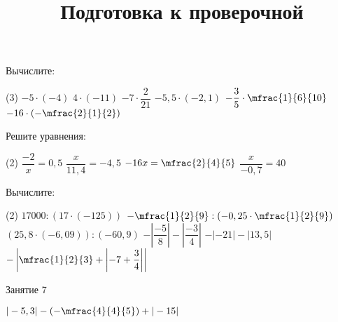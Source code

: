 \begin{homework}[number=3]
	\begin{listofex}
		\item Вычислите:
		\begin{tasks}(3)
			\task \( -5 \cdot (-4) \)
			\task \( 4 \cdot (-11) \)
			\task \( -7 \cdot \dfrac{2}{21} \)
			\task \( -5,5 \cdot (-2,1) \)
			\task \( -\dfrac{3}{5}\cdot \mfrac{1}{6}{10} \)
			\task \( -16 \cdot \left( -\mfrac{2}{1}{2} \right) \)
		\end{tasks}
		\item Решите уравнения:
		\begin{tasks}(2)
			\task \( \dfrac{-2}{x}=0,5 \)
			\task \( \dfrac{x}{11,4}=-4,5 \)
			\task \( -16x=\mfrac{2}{4}{5} \)
			\task \( \dfrac{x}{-0,7}=40 \)
		\end{tasks}
		\item Вычислите:
		\begin{tasks}(2)
			\task \( 17000:(17 \cdot(-125)) \)
			\task \( -\mfrac{1}{2}{9}:\left( -0,25 \cdot \mfrac{1}{2}{9} \right)  \)
			\task \( (25,8 \cdot (-6,09)):(-60,9) \)
			\task \(  -\left|\dfrac{-5}{8}\right|-\left|\dfrac{-3}{4}\right| \)
			\task \(  -|-21|-|13,5| \)
			\task \(  -\left|\mfrac{1}{2}{3} + \left|-7+\dfrac{3}{4}\right|\right| \)
		\end{tasks}
	\end{listofex}
\end{homework}

\begin{class}[number=7]
	\title{Подготовка к проверочной}
	\begin{listofex}
		\item Занятие 7
	\end{listofex}
\end{class}

\begin{exam}
	\begin{listofex}
		\item \( |-5,3| - \left(-\mfrac{4}{4}{5}\right) + |-15| \)
	\end{listofex}
\end{exam}

